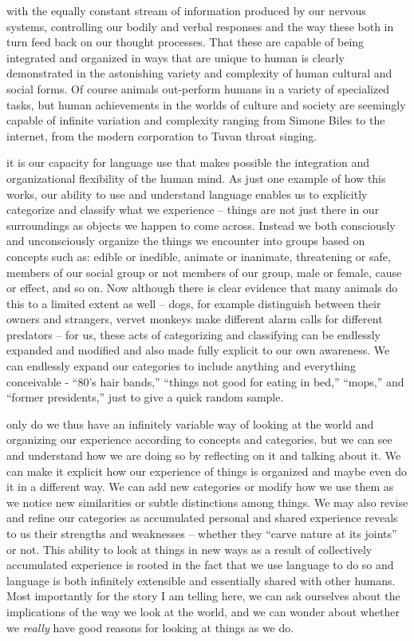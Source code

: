 \documentclass[justified]{tufte-book}
\begin{document}
 with the equally constant stream of information produced by our nervous systems, controlling our bodily and verbal responses and the way these both in turn feed back on our thought processes. That these are capable of being integrated and organized in ways that are unique to human is clearly demonstrated in the astonishing variety and complexity of human cultural and social forms. Of course animals out-perform humans in a variety of specialized tasks, but human achievements in the worlds of culture and society are seemingly capable of infinite variation and complexity ranging from Simone Biles to the internet, from the modern corporation to Tuvan throat singing.

 it is our capacity for language use that makes possible the integration and organizational flexibility of the human mind. As just one example of how this works, our ability to use and understand language enables us to explicitly categorize and classify what we experience -- things are not just there in our surroundings as objects we happen to come across. Instead we both consciously and unconsciously organize the things we encounter into groups based on concepts such as: edible or inedible, animate or inanimate, threatening or safe, members of our social group or not members of our group, male or female, cause or effect, and so on. Now although there is clear evidence that many animals do this to a limited extent as well -- dogs, for example distinguish between their owners and strangers, vervet monkeys make different alarm calls for different predators -- for us, these acts of categorizing and classifying can be endlessly expanded and modified and also made fully explicit to our own awareness. We can endlessly expand our categories to include anything and everything conceivable - ``80's hair bands,'' ``things not good for eating in bed,'' ``mops,'' and ``former presidents,'' just to give a quick random sample.

 only do we thus have an infinitely variable way of looking at the world and organizing our experience according to concepts and categories, but we can see and understand how we are doing so by reflecting on it and talking about it. We can make it explicit how our experience of things is organized and maybe even do it in a different way. We can add new categories or modify how we use them as we notice new similarities or subtle distinctions among things. We may also revise and refine our categories as accumulated personal and shared experience reveals to us their strengths and weaknesses -- whether they ``carve nature at its joints'' or not. This ability to look at things in new ways as a result of collectively accumulated experience is rooted in the fact that we use language to do so and language is both infinitely extensible and essentially shared with other humans. Most importantly for the story I am telling here, we can ask ourselves about the implications of the way we look at the world, and we can wonder about whether we \emph{really} have good reasons for looking at things as we do.
\end{document}
